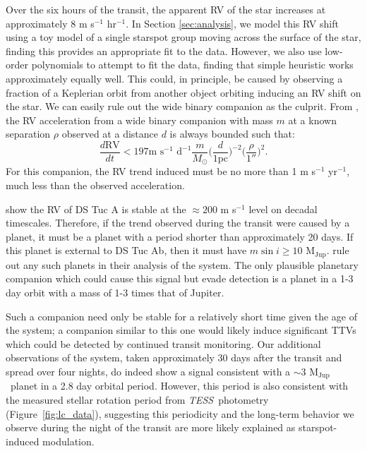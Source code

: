 \documentclass[twocolumn]{aastex63}
\newcommand{\tess}{{\it TESS}}
\newcommand{\mjup}{{M$_\textrm{Jup}$}}
\begin{document}
Over the six hours of the transit, the apparent RV of the star increases at approximately 8 m s$^{-1}$ hr$^{-1}$. 
In Section \ref{sec:analysis}, we model this RV shift using a toy model of a single 
starspot group moving across the surface of the star, finding this provides an appropriate fit to the data. 
However, we also use low-order polynomials to attempt to fit the data, finding that simple heuristic works approximately equally well.
This could, in principle, be caused by observing a fraction of a Keplerian orbit from another object orbiting inducing an RV shift on the star. 
We can easily rule out the wide binary companion as the culprit.
From \citet{Liu02}, the RV acceleration from a wide binary companion with mass $m$ at a known separation $\rho$ observed at a distance $d$ is always bounded such that:
\begin{equation}
    \frac{d\textrm{RV}}{dt} < 197 \textrm{m } \textrm{s}^{-1} \textrm{ d}^{-1}
    \frac{m}{M_\odot} \bigg(\frac{d}{1\textrm{pc}}\bigg)^{-2} \bigg(\frac{\rho}{1''}\bigg)^{2}.
\end{equation}
For this companion, the RV trend induced must be no more than 1 m s$^{-1}$ yr$^{-1}$, much less than the observed acceleration.

\citet{Benatti19} show the RV of DS Tuc A is stable at the $\approx 200$ m s$^{-1}$ level on decadal timescales. 
Therefore, if the trend observed during the transit were caused by a planet, it must be a planet with a period shorter than approximately 20 days. 
If this planet is external to DS Tuc Ab, then it must have $m \sin i \geq 10$ \mjup. 
\citet{Benatti19} rule out any such planets in their analysis of the system.
The only plausible planetary companion which could cause this signal but evade detection is a planet in a 1-3 day orbit with a mass of 1-3 times that of Jupiter. 

Such a companion need only be stable for a relatively short time given the age of the system; a companion similar to this one would likely induce significant TTVs which could be detected by continued transit monitoring.
Our additional observations of the system, taken approximately 30 days after the transit and spread over four nights, do indeed show a signal consistent with a $\sim 3$ \mjup\ planet in a 2.8 day orbital period. However, this period is also consistent with the measured stellar rotation period from \tess\ photometry (Figure~\ref{fig:lc_data}), suggesting this periodicity and the long-term behavior we observe during the night of the transit are more likely explained as starspot-induced modulation.
\end{document}
